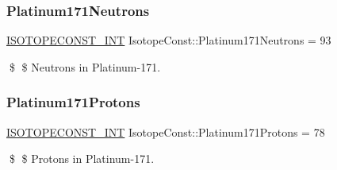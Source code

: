 \subsubsection{\texorpdfstring{Platinum171\+Neutrons}{Platinum171Neutrons}}
{\footnotesize\ttfamily \mbox{\hyperlink{group___isotope_const-_macros_ga5f18360b3e99483a35c32d789e62621c}{I\+S\+O\+T\+O\+P\+E\+C\+O\+N\+S\+T\+\_\+\+I\+NT}} Isotope\+Const\+::\+Platinum171\+Neutrons = 93}

\$ \$ Neutrons in Platinum-\/171. \mbox{\label{group___isotope_const-_platinum-_pt171_ga71da7595cdd422666b935ec9ed6a0890}} 
\subsubsection{\texorpdfstring{Platinum171\+Protons}{Platinum171Protons}}
{\footnotesize\ttfamily \mbox{\hyperlink{group___isotope_const-_macros_ga5f18360b3e99483a35c32d789e62621c}{I\+S\+O\+T\+O\+P\+E\+C\+O\+N\+S\+T\+\_\+\+I\+NT}} Isotope\+Const\+::\+Platinum171\+Protons = 78}

\$ \$ Protons in Platinum-\/171. 